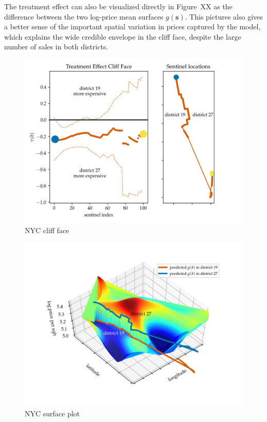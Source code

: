 \documentclass[letter]{article}
\makeatletter
\def\maxwidth{\ifdim\Gin@nat@width>\linewidth\linewidth
\else\Gin@nat@width\fi}
\let\Oldincludegraphics\includegraphics
\renewcommand{\includegraphics}[1]{\Oldincludegraphics[width=1.0\maxwidth]{#1}}
\newcommand{\svec}{\mathbold{s}}
\makeatother
\begin{document}
The treatment effect can also be visualized directly in Figure~XX as the difference between the two log-price mean surfaces \(g(\svec)\). This pictures also gives a better sense of the important spatial variation in prices captured by the model, which explains the wide credible envelope in the cliff face, despite the large number of sales in both districts.
    


    	\begin{figure}
\centering
\includegraphics{../NYC/NYC_plots/NYC_cliff_face.png}
\caption{NYC cliff face}
\end{figure}
    


    	\begin{figure}
\centering
\includegraphics{../NYC/NYC_plots/NYC_surface_plot_multi.png}
\caption{NYC surface plot}
\end{figure}
    
\end{document}
